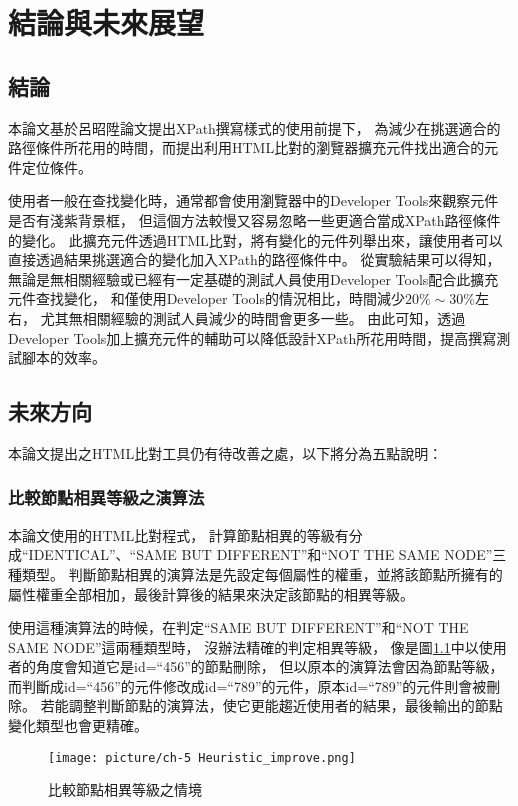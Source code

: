 \chapter{結論與未來展望}
\section{結論}\label{s5.1}
\indent
本論文基於呂昭陞論文提出XPath撰寫樣式的使用前提下，
為減少在挑選適合的路徑條件所花用的時間，而提出利用HTML比對的瀏覽器擴充元件找出適合的元件定位條件。

使用者一般在查找變化時，通常都會使用瀏覽器中的Developer Tools來觀察元件是否有淺紫背景框，
但這個方法較慢又容易忽略一些更適合當成XPath路徑條件的變化。
此擴充元件透過HTML比對，將有變化的元件列舉出來，讓使用者可以直接透過結果挑選適合的變化加入XPath的路徑條件中。
從實驗結果可以得知，
無論是無相關經驗或已經有一定基礎的測試人員使用Developer Tools配合此擴充元件查找變化，
和僅使用Developer Tools的情況相比，時間減少$20\%\sim30\%$左右，
尤其無相關經驗的測試人員減少的時間會更多一些。
由此可知，透過Developer Tools加上擴充元件的輔助可以降低設計XPath所花用時間，提高撰寫測試腳本的效率。

\section{未來方向}\label{s5.2}
\indent
本論文提出之HTML比對工具仍有待改善之處，以下將分為五點說明：

\subsection{比較節點相異等級之演算法}\label{s5.2.1}

本論文使用的HTML比對程式，
計算節點相異的等級有分成``IDENTICAL''、``SAME BUT DIFFERENT''和``NOT THE SAME NODE''三種類型。
判斷節點相異的演算法是先設定每個屬性的權重，並將該節點所擁有的屬性權重全部相加，最後計算後的結果來決定該節點的相異等級。

使用這種演算法的時候，在判定``SAME BUT DIFFERENT''和``NOT THE SAME NODE''這兩種類型時，
沒辦法精確的判定相異等級，
像是圖\ref{f5.1}中以使用者的角度會知道它是id=``456''的節點刪除，
但以原本的演算法會因為節點等級，
而判斷成id=``456''的元件修改成id=``789''的元件，原本id=``789''的元件則會被刪除。
若能調整判斷節點的演算法，使它更能趨近使用者的結果，最後輸出的節點變化類型也會更精確。

\indent
\begin{figure}[H]
    \centering
    \texttt{[image: picture/ch-5 Heuristic\_improve.png]}
    \caption{比較節點相異等級之情境}
    \label{f5.1}
\end{figure}

